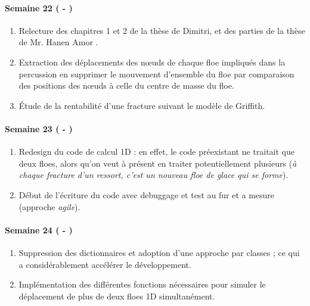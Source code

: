\paragraph{Semaine 22 ( - )} 
\begin{enumerate}
    \item Relecture des chapitres 1 et 2 de la thèse de Dimitri, et des parties de la thèse de Mr. Hanen Amor \parencite{amor2008approche}. 
    \item Extraction des déplacements des n\oe{}uds de chaque floe impliqués dans la percussion en supprimer le mouvement d'ensemble du floe par comparaison des positions des n\oe{}uds à celle du centre de masse du floe.
    \item Étude de la rentabilité d'une fracture suivant le modèle de Griffith.
\end{enumerate}
  
  
\paragraph{Semaine 23 ( - )} 
\begin{enumerate}
    \item Redesign du code de calcul 1D : en effet, le code préexistant ne traitait que deux floes, alors qu'on veut à présent en traiter potentiellement plusieurs (\emph{à chaque fracture d'un ressort, c'est un nouveau floe de glace qui se forme}).
    \item Début de l'écriture du code avec debuggage et test au fur et a mesure (approche \emph{agile}).
\end{enumerate}


\paragraph{Semaine 24 ( - )} 
\begin{enumerate}
    \item Suppression des dictionnaires et adoption d'une approche par classes ; ce qui a considérablement accélérer le développement.
    \item Implémentation des différentes fonctions nécessaires pour simuler le déplacement de plus de deux floes 1D simultanément.
\end{enumerate}
  
